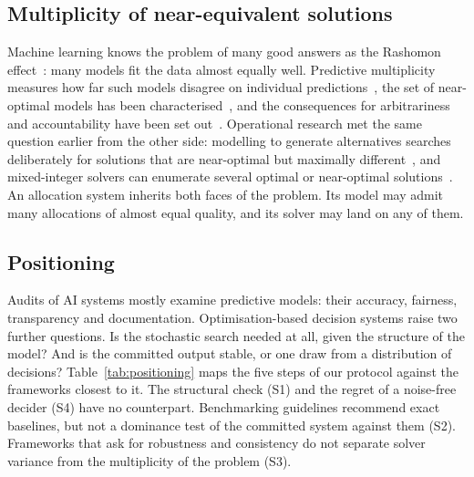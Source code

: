 \documentclass[systems,article,submit,moreauthors,pdftex]{Definitions/mdpi}
\begin{document}
\subsection{Multiplicity of near-equivalent solutions}
Machine learning knows the problem of many good answers as the Rashomon
effect~\cite{breiman2001twocultures}: many models fit the data almost equally well. Predictive
multiplicity measures how far such models disagree on individual
predictions~\cite{marx2020multiplicity}, the set of near-optimal models has been
characterised~\cite{semenova2022rashomon,fisher2019allmodels}, and the consequences for
arbitrariness and accountability have been set out~\cite{black2022multiplicity}. Operational
research met the same question earlier from the other side: modelling to generate
alternatives searches deliberately for solutions that are near-optimal but maximally
different~\cite{brill1979public,brill1982mga}, and mixed-integer solvers can enumerate several
optimal or near-optimal solutions~\cite{danna2007multiple}. An allocation system inherits both
faces of the problem. Its model may admit many allocations of almost equal quality, and its
solver may land on any of them.

\subsection{Positioning}\label{sec:positioning}
Audits of AI systems mostly examine predictive models: their accuracy, fairness,
transparency and documentation. Optimisation-based decision systems raise two further
questions. Is the stochastic search needed at all, given the structure of the model? And is
the committed output stable, or one draw from a distribution of decisions?
Table~\ref{tab:positioning} maps the five steps of our protocol against the frameworks closest
to it. The structural check (S1) and the regret of a noise-free decider (S4) have no
counterpart. Benchmarking guidelines recommend exact baselines, but not a dominance test of the
committed system against them (S2). Frameworks that ask for robustness and consistency do not
separate solver variance from the multiplicity of the problem (S3).
\end{document}

